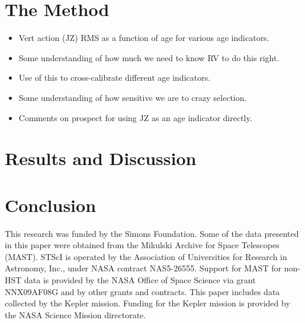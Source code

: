 \documentclass[useAMS, usenatbib, preprint, 12pt]{aastex}
\begin{document}
\section{The Method}

\begin{itemize}
    \item{Vert action (JZ) RMS as a function of age for various age
        indicators.}
    \item{Some understanding of how much we need to know RV to do this right.}
    \item{Use of this to cross-calibrate different age indicators.}
    \item{Some understanding of how sensitive we are to crazy selection.}
    \item{Comments on prospect for using JZ as an age indicator directly.}
\end{itemize}




\section{Results and Discussion}



\section{Conclusion}


This research was funded by the Simons Foundation.
Some of the data presented in this paper were obtained from the Mikulski
Archive for Space Telescopes (MAST).
STScI is operated by the Association of Universities for Research in
Astronomy, Inc., under NASA contract NAS5-26555.
Support for MAST for non-HST data is provided by the NASA Office of Space
Science via grant NNX09AF08G and by other grants and contracts.
This paper includes data collected by the Kepler mission. Funding for the
Kepler mission is provided by the NASA Science Mission directorate.



\end{document}
